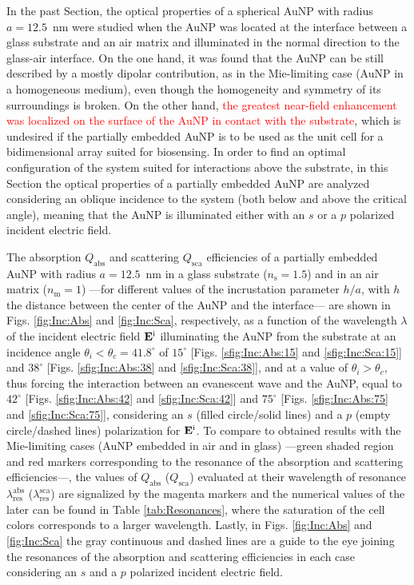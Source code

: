 
In the past Section, the optical properties of a spherical AuNP with radius $a = 12.5$~nm were studied when the AuNP was located at the interface between a glass substrate and an air matrix and illuminated in the normal direction to the glass-air interface. On the one hand, it was found that the AuNP can be still described by a mostly dipolar contribution, as in the Mie-limiting case (AuNP in a homogeneous medium), even though the homogeneity and symmetry of its surroundings is broken. On the other hand, \textcolor{red}{the greatest near-field enhancement was localized on  the surface of the AuNP in contact with the substrate}, which is undesired if the partially embedded AuNP is to be used as the unit cell for a bidimensional array suited for biosensing. In order to find an optimal configuration of the system suited for interactions above the substrate, in this Section the optical properties of a partially embedded AuNP are analyzed considering an oblique incidence to the system (both below and above the critical angle), meaning that the AuNP is illuminated either with an $s$ or a $p$ polarized incident electric field.

The absorption $Q_\text{abs}$ and scattering $Q_\text{sca}$ efficiencies of a partially embedded  AuNP with radius $a =12.5$~nm in a glass substrate ($n_\text{s} = 1.5$) and in an air matrix ($n_\text{m} = 1$) ---for different values of the incrustation parameter $h/a$, with $h$ the distance between the center of the AuNP and the interface--- are shown in Figs. \ref{fig:Inc:Abs} and \ref{fig:Inc:Sca}, respectively, as a function of the wavelength $\lambda$ of the incident electric field $\vb{E}^\text{i}$ illuminating the AuNP from the substrate at an incidence angle $\theta_i < \theta_c = 41.8^\circ$ of $15^\circ$ [Figs. \ref{sfig:Inc:Abs:15} and \ref{sfig:Inc:Sca:15}] and  $38^\circ$ [Figs. \ref{sfig:Inc:Abs:38} and \ref{sfig:Inc:Sca:38}], and  at a value of $\theta_i>\theta_c$, thus forcing the interaction between an evanescent wave and the AuNP, equal to $42^\circ$  [Figs. \ref{sfig:Inc:Abs:42} and \ref{sfig:Inc:Sca:42}] and $75^\circ$  [Figs. \ref{sfig:Inc:Abs:75} and \ref{sfig:Inc:Sca:75}], considering an $s$ (filled circle/solid lines) and a $p$ (empty circle/dashed lines) polarization for $\vb{E}^\text{i}$. To compare to obtained results with the Mie-limiting cases (AuNP embedded in air and in glass) ---green shaded region and red markers corresponding to the resonance of the absorption and scattering efficiencies---, the values of $Q_\text{abs}$ ($Q_\text{sca}$) evaluated at their wavelength of resonance $\lambda_\text{res}^\text{abs}$ ($\lambda_\text{res}^\text{sca}$) are signalized by the magenta markers and the numerical values of the later can be found in Table \ref{tab:Resonances}, where the saturation of the cell colors corresponds to a larger wavelength. Lastly, in Figs. \ref{fig:Inc:Abs} and \ref{fig:Inc:Sca} the gray continuous and dashed lines are a guide to the eye joining the resonances of the absorption and scattering efficiencies in each case considering an $s$ and a $p$ polarized incident electric field.

